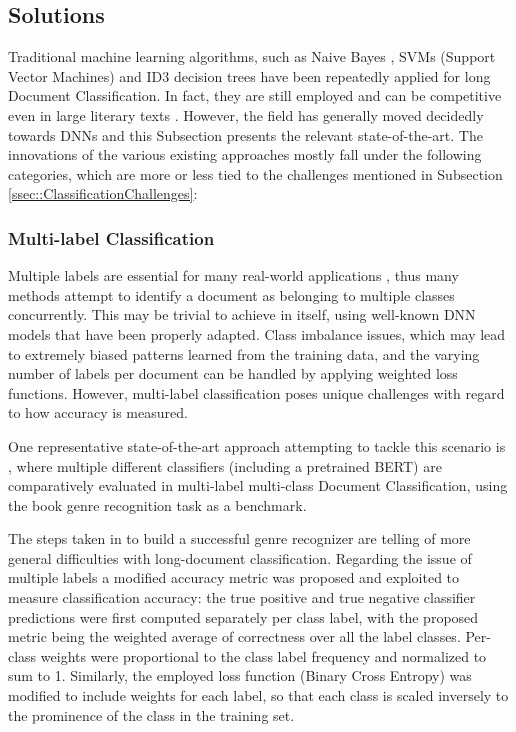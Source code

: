\documentclass[preprint,review,12pt]{elsarticle}
\begin{document}
\subsection{Solutions}
\label{ssec::ClassificationSolutions}

Traditional machine learning algorithms, such as Naive Bayes \cite{russel}, SVMs (Support Vector Machines) \cite{cortes} and ID3 decision trees \cite{quinlan} have been repeatedly applied for long Document Classification. In fact, they are still employed \cite{brazil} \cite{xu} and can be competitive even in large literary texts \cite{sicong}. However, the field has generally moved decidedly towards DNNs and this Subsection presents the relevant state-of-the-art. The innovations of the various existing approaches mostly fall under the following categories, which are more or less tied to the challenges mentioned in Subsection \ref{ssec::ClassificationChallenges}:


\subsubsection{Multi-label Classification}

Multiple labels are essential for many real-world applications \cite{hsu} \cite{patentnet}, thus many methods attempt to identify a document as belonging to multiple classes concurrently. This may be trivial to achieve in itself, using well-known DNN models that have been properly adapted. Class imbalance issues, which may lead to extremely biased patterns learned from the training data, and the varying number of labels per document can be handled by applying weighted loss functions. However, multi-label classification poses unique challenges with regard to how accuracy is measured.

One representative state-of-the-art approach attempting to tackle this scenario is \citet{sicong}, where multiple different classifiers (including a pretrained BERT) are comparatively evaluated in multi-label multi-class Document Classification, using the book genre recognition task as a benchmark.

The steps taken in \citet{sicong} to build a successful genre recognizer are telling of more general difficulties with long-document classification. Regarding the issue of multiple labels a modified accuracy metric was proposed and exploited to measure classification accuracy: the true positive and true negative classifier predictions were first computed separately per class label, with the proposed metric being the weighted average of correctness over all the label classes. Per-class weights were proportional to the class label frequency and normalized to sum to 1. Similarly, the employed loss function (Binary Cross Entropy) was modified to include weights for each label, so that each class is scaled inversely to the prominence of the class in the training set. 
\end{document}
